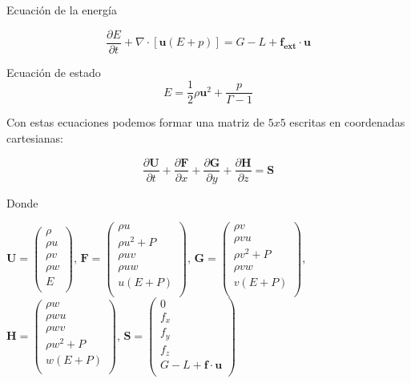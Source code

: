 \documentclass[12pt,a4paper]{book}
\begin{document}
Ecuación de la energía

\begin{equation} \label{conservacion_energia_hidrodinamica}
\dfrac{\partial E }{\partial t} + \nabla \cdot \left[ \mathbf{u} \left( E+p \right) \right] =G-L+\mathbf{f_{ext} \cdot \mathbf{u}}
\end{equation}

Ecuación de estado
\begin{equation}
E=\frac{1}{2} \rho \mathbf{u}^{2} + \frac{p}{\Gamma - 1}
\end{equation}

Con estas ecuaciones podemos formar una matriz de $5x5$ escritas en coordenadas cartesianas:

\begin{equation} \label{euler_cartesianas}
\dfrac{\partial \mathbf{U}}{\partial t}+\dfrac{\partial \mathbf{F}}{\partial x}+\dfrac{\partial \mathbf{G}}{\partial y}+\dfrac{\partial \mathbf{H}}{\partial z}= \mathbf{S}
\end{equation}

Donde\\
\begin{center}


$\mathbf{U}=
\left(\begin{smallmatrix}
\rho \\
\rho u \\
\rho v \\
\rho w \\
E \\
\end{smallmatrix}\right)
$,
$\mathbf{F} =
\left(\begin{smallmatrix}
\rho u \\
\rho u^{2}+P \\
\rho uv \\
\rho uw \\
u(E+P) \\
\end{smallmatrix}\right)
$,
$\mathbf{G} =
\left(\begin{smallmatrix}
\rho v\\
\rho vu \\
\rho v^{2}+P \\
\rho vw \\
v(E+P) \\
\end{smallmatrix}\right)
$,
$\mathbf{H} =
\left(\begin{smallmatrix}
\rho w\\
\rho wu \\
\rho wv \\
\rho w^{2}+P \\
w(E+P) \\
\end{smallmatrix}\right)
$, 
$\mathbf{S} =
\left(\begin{smallmatrix}
0 \\
f_{x} \\
f_{y} \\
f_{z} \\
G-L+\textbf{f} \cdot \textbf{u} \\
\end{smallmatrix}\right)
$
\end{center}
\end{document}
